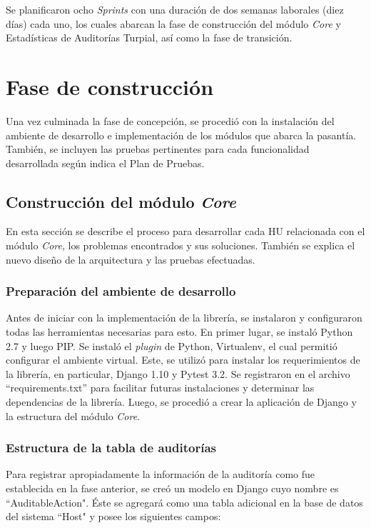 Se planificaron ocho \textit{Sprints} con una duración de dos semanas laborales (diez días) cada uno, los cuales abarcan la fase de construcción del módulo \textit{Core} y Estadísticas de Auditorías Turpial, así como la fase de transición.

\section{Fase de construcción}

Una vez culminada la fase de concepción, se procedió con la instalación del ambiente de desarrollo e implementación de los módulos que abarca la pasantía. También, se incluyen las pruebas pertinentes para cada funcionalidad desarrollada según indica el Plan de Pruebas.

\subsection{Construcción del módulo \textit{Core}}

En esta sección se describe el proceso para desarrollar cada HU relacionada con el módulo \textit{Core}, los problemas encontrados y sus soluciones. También se explica el nuevo diseño de la arquitectura y las pruebas efectuadas.

\subsubsection{Preparación del ambiente de desarrollo}

Antes de iniciar con la implementación de la librería, se instalaron y configuraron todas las herramientas necesarias para esto. En primer lugar, se instaló Python 2.7 y luego PIP. Se instaló el \textit{plugin} de Python, Virtualenv, el cual permitió configurar el ambiente virtual. Este, se utilizó para instalar los requerimientos de la librería, en particular, Django 1.10 y Pytest 3.2. Se registraron en el archivo “requirements.txt” para facilitar futuras instalaciones y determinar las dependencias de la librería. Luego, se procedió a crear la aplicación de Django y la estructura del módulo \textit{Core}.

\subsubsection{Estructura de la tabla de auditorías}

Para registrar apropiadamente la información de la auditoría como fue establecida en la fase anterior, se creó un modelo en Django cuyo nombre es “AuditableAction". Éste se agregará como una tabla adicional en la base de datos del sistema “Host" y posee los siguientes campos:\\

